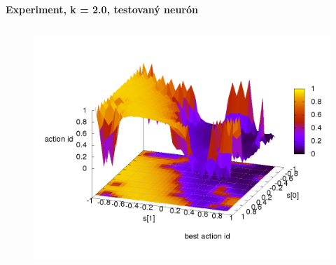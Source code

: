 \documentclass[xcolor=dvipsnames]{beamer}
\begin{document}
\begin{frame}{\bf Experiment, k = 2.0, testovaný neurón}
\begin{columns}
\begin{column}{0.5\textwidth}
\begin{figure}[ht]
        \begin{center}
        \includegraphics[width=1.0\textwidth]{experiment_02/testing_neuron/q_action_id.png}
        \end{center}

        \end{figure}

	\end{column}
\end{columns}

\end{frame}
\end{document}
